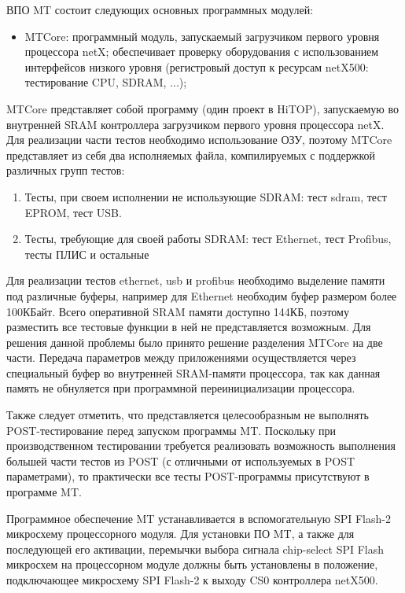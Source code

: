 \documentclass[a4paper,14pt,bachelor]{disser}
\begin{document}
ВПО MT состоит следующих основных программных модулей:
\begin{itemize}
 \item MTCore: программный модуль, запускаемый загрузчиком первого уровня процессора netX; обеспечивает проверку оборудования с использованием интерфейсов низкого уровня (регистровый доступ к ресурсам netX500: тестирование CPU, SDRAM, ...);
\end{itemize}

MTCore представляет собой программу (один проект в HiTOP), запускаемую во внутренней SRAM контроллера загрузчиком первого уровня процессора netX. Для реализации части тестов необходимо использование ОЗУ, поэтому MTCore представляет из себя два исполняемых файла, компилируемых с поддержкой различных групп тестов:
\begin{enumerate}
 \item Тесты, при своем исполнении не использующие SDRAM: тест sdram, тест EPROM, тест USB.
 \item Тесты, требующие для своей работы SDRAM: тест Ethernet, тест Profibus, тесты ПЛИС и остальные
\end{enumerate}

Для реализации тестов ethernet, usb и profibus необходимо выделение памяти под различные буферы, например для Ethernet необходим буфер размером более 100КБайт. Всего оперативной SRAM памяти доступно 144КБ, поэтому разместить все тестовые функции в ней не представляется возможным. Для решения данной проблемы было принято решение разделения MTCore на две части. Передача параметров между приложениями осуществляется через специальный буфер во внутренней SRAM-памяти процессора, так как данная память не обнуляется при программной переинициализации процессора.

Также следует отметить, что представляется целесообразным не выполнять POST-тестирование перед запуском программы MT. Поскольку при производственном тестировании требуется реализовать возможность выполнения большей части тестов из POST (с отличными от используемых в POST параметрами), то практически все тесты POST-программы присутствуют в программе MT.

Программное обеспечение MT устанавливается в вспомогательную SPI Flash-2 микросхему процессорного модуля. Для установки ПО MT, а также для последующей его активации, перемычки выбора сигнала chip-select SPI Flash микросхем на процессорном модуле должны быть установлены в положение, подключающее микросхему SPI Flash-2 к выходу CS0 контроллера netX500.
\end{document}
